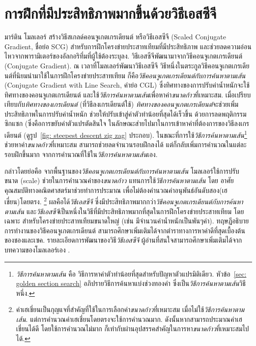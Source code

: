 \section{การฝึกที่มีประสิทธิภาพมากขึ้นด้วยวิธีเอสซีจี}

มาร์ติน โมลเลอร์ สร้างวิธีสเกลด์คอนจูเกตเกรเดียนต์\cite{Moller1993a} หรือวิธีเอสซีจี (Scaled Conjugate Gradient, ชื่อย่อ SCG) สำหรับการฝึกโครงข่ายประสาทเทียมที่มีประสิทธิภาพ 
และช่วยลดความอ่อนไหวจากพารามิเตอร์ของอัลกอริทึ่มที่ผู้ใช้ต้องระบุลง.
วิธีเอสซีจีพัฒนามาจากวิธีคอนจูเกตเกรเดียนต์ (Conjugate Gradient).
ณ เวลาที่โมลเลอร์พัฒนาวิธีเอสซีจี 
วิธีหนึ่งในตระกูลวิธีคอนจูเกตเกรเดียนต์ที่นิยมนำมาใช้ในการฝึกโครงข่ายประสาทเทียม 
ก็คือ\textit{วิธีคอนจูเกตเกรเดียนต์กับการค้นหาตามเส้น} (Conjugate Gradient with Line Search, คำย่อ CGL)
ซึ่งทิศทางของการปรับค่าน้ำหนักจะใช้ทิศทางของคอนจูเกตเกรเดียนต์ และใช้\textit{วิธีการค้นหาตามเส้น}เพื่อหาค่า\textit{ขนาดก้าว}ที่เหมาะสม.
เมื่อเปรียบเทียบกับ\textit{ทิศทางของเกรเดียนต์} (ที่วิธีลงเกรเดียนต์ใช้) 
\textit{ทิศทางของคอนจูเกตเกรเดียนต์}จะช่วยเพิ่มประสิทธิภาพในการปรับค่าน้ำหนัก ช่วยให้ปรับเข้าสู่ค่าตัวทำน้อยที่สุดได้เร็วขึ้น ด้วยการลดพฤติกรรมซิกแซก (ซึ่งคือการขยับค่าตัวแปรตัดสินใจ ในลักษณะส่ายไปมาในการเข้าหาค่าที่ต้องการของวิธีลงเกรเดียนต์ (ดูรูป~\ref{fig: steepest descent zig zag} ประกอบ).
ในขณะที่การใช้\textit{วิธีการค้นหาตามเส้น}\footnote{
\textit{วิธีการค้นหาตามเส้น} คือ วิธีการหาค่าตัวทำน้อยที่สุดสำหรับปัญหาตัวแปรมิติเดียว.
หัวข้อ~\ref{sec: golden section search} อภิปรายวิธีการค้นหาแบ่งช่วงทองคำ ซึ่งเป็น\textit{วิธีการค้นหาตามเส้น}วิธีหนึ่ง.
} 
ช่วยหาค่า\textit{ขนาดก้าว}ที่เหมาะสม สามารถช่วยลดจำนวนรอบฝึกลงได้ แต่ก็กลับเพิ่มการคำนวณในแต่ละรอบฝึกขึ้นมาก
จากการคำนวณที่ใช้ใน\textit{วิธีการค้นหาตามเส้น}เอง.

กล่าวโดยย่อคือ จากพื้นฐานของ\textit{วิธีคอนจูเกตเกรเดียนต์กับการค้นหาตามเส้น} โมลเลอร์ใช้การปรับขนาด (scale) ช่วยในการคำนวณค่าของ\textit{ขนาดก้าว} แทนการใช้\textit{วิธีการค้นหาตามเส้น} โดย อาศัยคุณสมบัติทางคณิตศาสตร์มาช่วยทำการประมาณ เพื่อไม่ต้องคำนวณค่าอนุพันธ์อันดับสอง(เฮเชี่ยน)โดยตรง.%
\footnote{ค่าเฮเชี่ยนเป็นกุญแจที่สำคัญที่ใช้ในการเลือกค่า\textit{ขนาดก้าว}ที่เหมาะสม เมื่อไม่ใช้\textit{วิธีการค้นหาตามเส้น}.
แต่การคำนวณค่าเฮเชี่ยนโดยตรงจะใช้การคำนวณมาก.
ดังนั้นหากสามารถประมาณค่าเฮเชี่ยนได้ดี โดยใช้การคำนวณไม่มาก ก็เท่ากับผ่านอุปสรรคสำคัญในการหา\textit{ขนาดก้าว}ที่เหมาะสมไปได้.
}
ผลคือได้\textit{วิธีเอสซีจี} ซึ่งมีประสิทธิภาพมากกว่า\textit{วิธีคอนจูเกตเกรเดียนต์กับการค้นหาตามเส้น}
และ\textit{วิธีเอสซีจี}เป็นหนึ่งในวิธีที่มีประสิทธิภาพมากที่สุดในการฝึกโครงข่ายประสาทเทียม 
โดยเฉพาะ สำหรับโครงข่ายประสาทเทียมขนาดใหญ่ (เช่น มีจำนวนค่าน้ำหนักเป็นพันๆค่า)\cite{MatlabNNToolbox2010}.
ทฤษฏีอธิบายการทำงานของวิธีคอนจูเกตเกรเดียนต์ สามารถศึกษาเพิ่มเติมได้จากตำราทางการหาค่าดีที่สุดเบื้องต้นของชองและเซค\cite{ChongZak2ndEd}.
รายละเอียดการพัฒนาของวิธี\textit{วิธีเอสซีจี} ผู้อ่านที่สนใจสามารถศึกษาเพิ่มเติมได้จากบทความของโมลเลอร์เอง \cite{Moller1993a}.

